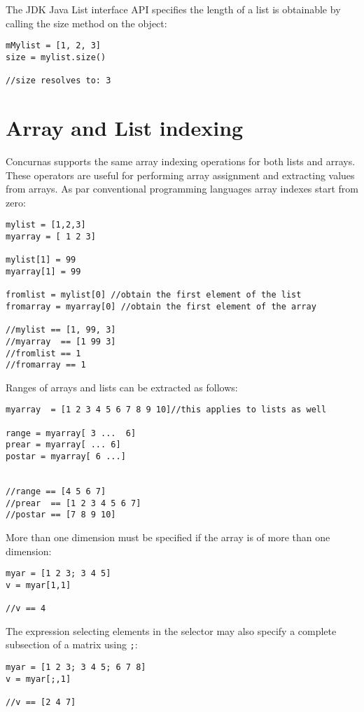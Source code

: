 \documentclass[conc-doc]{subfiles}
\begin{document}
The JDK Java List interface API specifies the length of a list is obtainable by calling the size method on the object:
\begin{lstlisting}
mMylist = [1, 2, 3]
size = mylist.size()

//size resolves to: 3
\end{lstlisting}

\section{Array and List indexing}
Concurnas supports the same array indexing operations for both lists and arrays. These operators are useful for performing array assignment and extracting values from arrays. As par conventional programming languages array indexes start from zero:

\begin{lstlisting}
mylist = [1,2,3]
myarray = [ 1 2 3]

mylist[1] = 99
myarray[1] = 99

fromlist = mylist[0] //obtain the first element of the list
fromarray = myarray[0] //obtain the first element of the array

//mylist == [1, 99, 3]
//myarray  == [1 99 3]
//fromlist == 1
//fromarray == 1
\end{lstlisting}

Ranges of arrays and lists can be extracted as follows:
\begin{lstlisting}
myarray  = [1 2 3 4 5 6 7 8 9 10]//this applies to lists as well

range = myarray[ 3 ...  6]
prear = myarray[ ... 6]
postar = myarray[ 6 ...]


//range == [4 5 6 7]
//prear  == [1 2 3 4 5 6 7]
//postar == [7 8 9 10]
\end{lstlisting}

More than one dimension must be specified if the array is of more than one dimension:
\begin{lstlisting}
myar = [1 2 3; 3 4 5]
v = myar[1,1]

//v == 4
\end{lstlisting}

The expression selecting elements in the selector may also specify a complete subsection of a matrix using \lstinline{;}:
\begin{lstlisting}
myar = [1 2 3; 3 4 5; 6 7 8]
v = myar[;,1]

//v == [2 4 7]
\end{lstlisting}
\end{document}
